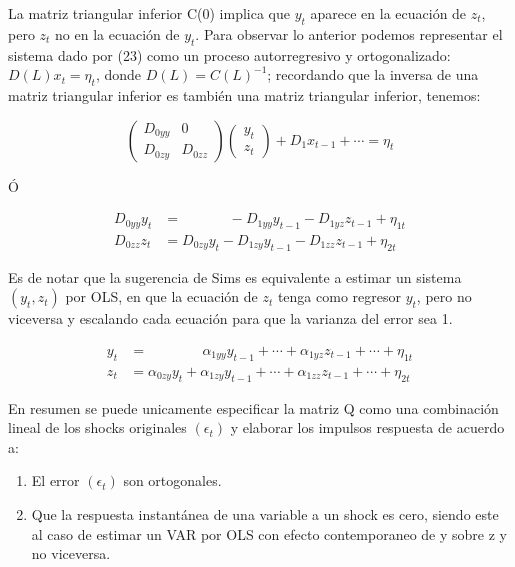 \documentclass[
]{book}
\providecommand{\tightlist}{%
  \setlength{\itemsep}{0pt}\setlength{\parskip}{0pt}}
\begin{document}
La matriz triangular inferior C(0) implica que \(y_{t}\) aparece en la ecuación de \(z_{t}\), pero \(z_{t}\) no en la ecuación de \(y_{t}\). Para observar lo anterior podemos representar el sistema dado por (23) como un proceso autorregresivo y ortogonalizado: \(D(L)x_{t}=\eta_{t}\), donde \(D(L)=C(L)^{-1}\); recordando que la inversa de una matriz triangular inferior es también una matriz triangular inferior, tenemos:

\begin{equation}
      \left( \begin{array}{cc}
      D_{0yy} & 0\\
      D_{0zy} & D_{0zz}
      \end{array}
      \right)
      \left( \begin{array}{c}
      y_{t} \\
      z_{t} 
      \end{array}\right)+D_{1}x_{t-1}+\cdots=\eta_{t}\nonumber
\end{equation}

Ó

\begin{align}
D_{0yy}y_{t}&=\;\;\;\;\;\;\;\;\;\;\;\;-D_{1yy}y_{t-1}-D_{1yz}z_{t-1}+\eta_{1t}\nonumber \\
D_{0zz}z_{t}&=D_{0zy}y_{t}-D_{1zy}y_{t-1}-D_{1zz}z_{t-1}+\eta_{2t}\nonumber
\end{align}

Es de notar que la sugerencia de Sims es equivalente a estimar un sistema \((y_{t}, z_{t})\) por OLS, en que la ecuación de \(z_{t}\) tenga como regresor \(y_{t}\), pero no viceversa y escalando cada ecuación para que la varianza del error sea 1.

\begin{align}
y_{t}&=\;\;\;\;\;\;\;\;\;\;\;\;\;\;\alpha_{1yy}y_{t-1}+\cdots+\alpha_{1yz}z_{t-1}+\cdots+\eta_{1t}\nonumber \\
z_{t}&=\alpha_{0zy}y_{t}+\alpha_{1zy}y_{t-1}+\cdots+\alpha_{1zz}z_{t-1}+\cdots +\eta_{2t}\nonumber
\end{align}

En resumen se puede unicamente especificar la matriz Q como una combinación lineal de los shocks originales \((\epsilon_{t})\) y elaborar los impulsos respuesta de acuerdo a:

\begin{enumerate}
\def\labelenumi{\arabic{enumi}.}
\tightlist
\item
  El error \((\epsilon_{t})\) son ortogonales.
\item
  Que la respuesta instantánea de una variable a un shock es cero, siendo este al caso de estimar un VAR por OLS con efecto contemporaneo de y sobre z y no viceversa.
\end{enumerate}
\end{document}
